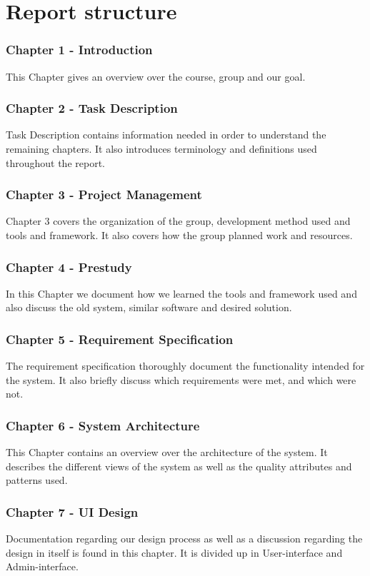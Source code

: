  
\section{Report structure}


\subsubsection{Chapter 1 - Introduction}
This Chapter gives an overview over the course, group and our goal. 


\subsubsection{Chapter 2 - Task Description}
Task Description contains information needed in order to understand the remaining chapters. It also introduces terminology and definitions used throughout the report. 


\subsubsection{Chapter 3 - Project Management}
Chapter 3 covers the organization of the group, development method used and tools and framework. It also covers how the group planned work and resources. 


\subsubsection{Chapter 4 - Prestudy}
In this Chapter we document how we learned the tools and framework used and also discuss the old system, similar software and desired solution. 


\subsubsection{Chapter 5 - Requirement Specification}
The requirement specification thoroughly document the functionality intended for the system. It also briefly discuss which requirements were met, and which were not. 


\subsubsection{Chapter 6 - System Architecture}
This Chapter contains an overview over the architecture of the system. It describes the different views of the system as well as the quality attributes and patterns used. 


\subsubsection{Chapter 7 - UI Design }
Documentation regarding our design process as well as a discussion regarding the design in itself is found in this chapter. It is divided up in User-interface and Admin-interface. 


